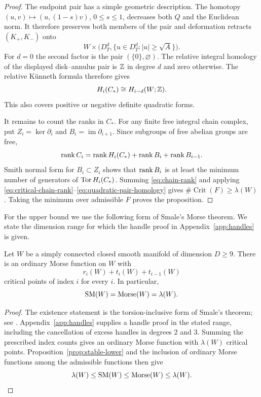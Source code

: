 \begin{proof}
The endpoint pair has a simple geometric description.  The homotopy
$(u,v)\mapsto(u,(1-s)v)$, $0\leq s\leq1$, decreases both $Q$ and the
Euclidean norm.  It therefore preserves both members of the pair and
deformation retracts $(K_+,K_-)$ onto
\[
 W\times\bigl(D_T^d,
       \{u\in D_T^d:|u|\geq\sqrt A\}\bigr).
\]
For $d=0$ the second factor is the pair $(\{0\},\varnothing)$.
The relative integral homology of the displayed disk--annulus pair is
$\mathbb Z$ in degree $d$ and zero otherwise.  The relative K\"unneth formula
therefore gives
\begin{equation}\label{eq:quadratic-pair-homology}
 H_i(C_*)\cong H_{i-d}(W;\mathbb Z).
\end{equation}
This also covers positive or negative definite quadratic forms.

It remains to count the ranks in $C_*$.  For any finite free integral
chain complex, put $Z_i=\ker\partial_i$ and
$B_i=\operatorname{im}\partial_{i+1}$.  Since subgroups of free abelian
groups are free,
\begin{equation}\label{eq:chain-rank}
 \operatorname{rank} C_i=\operatorname{rank} H_i(C_*)+\operatorname{rank} B_i+\operatorname{rank} B_{i-1}.
\end{equation}
Smith normal form for $B_i\subset Z_i$ shows that $\operatorname{rank} B_i$ is at
least the minimum number of generators of $\operatorname{Tor} H_i(C_*)$.
Summing \eqref{eq:chain-rank} and applying
\eqref{eq:critical-chain-rank}--\eqref{eq:quadratic-pair-homology} gives
$\#\operatorname{Crit}(F)\geq\lambda(W)$.  Taking the minimum over
admissible $F$ proves the proposition.
\end{proof}

For the upper bound we use the following form of Smale's Morse theorem.
We state the dimension range for which the handle proof in
Appendix~\ref{app:handles} is given.

\begin{theorem}[Smale]\label{thm:smale}
Let $W$ be a simply connected closed smooth manifold of dimension $D\geq9$.
There is an ordinary Morse function on $W$ with
\[
 r_i(W)+t_i(W)+t_{i-1}(W)
\]
critical points of index $i$ for every $i$.  In particular,
\begin{equation}\label{eq:simply-connected-morse}
 \operatorname{SM}(W)=\operatorname{Morse}(W)=\lambda(W).
\end{equation}
\end{theorem}

\begin{proof}
The existence statement is the torsion-inclusive form of Smale's theorem;
see \cite[Theorem~2.4 and the following paragraph]{Smale1963}.
Appendix~\ref{app:handles} supplies a handle proof in the stated range,
including the cancellation of excess handles in degrees $2$ and $3$.
Summing the prescribed index counts gives an ordinary Morse function with
$\lambda(W)$ critical points.  Proposition~\ref{prop:stable-lower} and
the inclusion of ordinary Morse functions among the admissible functions
then give
\[
 \lambda(W)\leq\operatorname{SM}(W)\leq\operatorname{Morse}(W)\leq\lambda(W).
\]
\end{proof}


